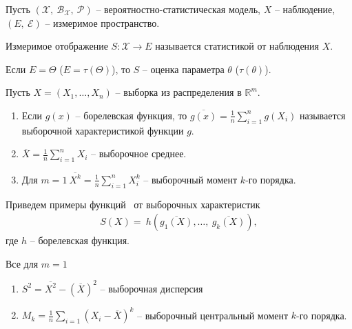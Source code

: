 Пусть $\displaystyle (\mathcal{X},\ \mathcal{B}_{\mathcal{X}},\ \mathcal{P})$ -- вероятностно-статистическая модель, $\displaystyle X$ -- наблюдение, $\displaystyle ( E,\ \mathcal{E})$ -- измеримое пространство.
\begin{definition}
Измеримое отображение $\displaystyle S:\mathcal{X}\rightarrow E$ называется статистикой от наблюдения $\displaystyle X$.
\end{definition}
\begin{definition}
Если $\displaystyle E=\Theta $ ($\displaystyle E=\tau ( \Theta )$), то $\displaystyle S$ -- оценка параметра $\displaystyle \theta $ ($\displaystyle \tau ( \theta )$).
\end{definition}
\begin{example}
Пусть $\displaystyle X=( X_{1} ,\dotsc ,X_{n})$ -- выборка из распределения в $\displaystyle \mathbb{R}^{m}$.
\begin{enumerate}
    \item Если $\displaystyle g( x)$ -- борелевская функция, то $\displaystyle \overline{g( x)} =\frac{1}{n}\sum _{i=1}^{n} g( X_{i})$ называется выборочной характеристикой функции $\displaystyle g$.
    
    \item $\displaystyle \overline{X} =\frac{1}{n}\sum _{i=1}^{n} X_{i}$ -- выборочное среднее.
    
    \item Для $\displaystyle m=1\ \overline{X^{k}} =\frac{1}{n}\sum _{i=1}^{n} X_{i}^{k}$ -- выборочный момент $\displaystyle k$-го порядка.
\end{enumerate}
\end{example}
Приведем примеры функций \ от выборочных характеристик 
\begin{gather*}
    S( X) =\ h\left(\overline{g_{1}( X)} ,\dotsc,\ \overline{g_{k}( X)}\right),
\end{gather*}
где $h$ -- борелевская функция.
\begin{example}
Все для $\displaystyle m=1$
\begin{enumerate}
    \item $\displaystyle S^{2} =\overline{X^{2}} -(\overline{X})^{2}$ -- выборочная дисперсия
    
    \item $\displaystyle M_{k} =\frac{1}{n}\sum _{i=1}( X_{i} -\overline{X})^{k}$ -- выборочный центральный момент $\displaystyle k$-го порядка.
\end{enumerate}
\end{example}

